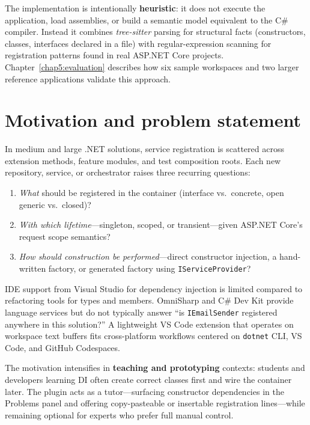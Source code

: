 The implementation is intentionally \textbf{heuristic}: it does not execute the application, load assemblies, or build a semantic model equivalent to the C\# compiler. Instead it combines \emph{tree-sitter} parsing for structural facts (constructors, classes, interfaces declared in a file) with regular-expression scanning for registration patterns found in real ASP.NET Core projects. Chapter~\ref{chap5:evaluation} describes how six sample workspaces and two larger reference applications validate this approach.

\section{Motivation and problem statement}
\label{chap1:motivation}

In medium and large .NET solutions, service registration is scattered across extension methods, feature modules, and test composition roots. Each new repository, service, or orchestrator raises three recurring questions:
\begin{enumerate}
	\item \emph{What} should be registered in the container (interface vs.\ concrete, open generic vs.\ closed)?
	\item \emph{With which lifetime}---singleton, scoped, or transient---given ASP.NET Core's request scope semantics?
	\item \emph{How should construction be performed}---direct constructor injection, a hand-written factory, or generated factory using \texttt{IServiceProvider}?
\end{enumerate}

IDE support from Visual Studio for dependency injection is limited compared to refactoring tools for types and members. OmniSharp and C\# Dev Kit provide language services but do not typically answer ``is \texttt{IEmailSender} registered anywhere in this solution?'' A lightweight VS Code extension that operates on workspace text buffers fits cross-platform workflows centered on \texttt{dotnet} CLI, VS Code, and GitHub Codespaces.

The motivation intensifies in \textbf{teaching and prototyping} contexts: students and developers learning DI often create correct classes first and wire the container later. The plugin acts as a tutor---surfacing constructor dependencies in the Problems panel and offering copy-pasteable or insertable registration lines---while remaining optional for experts who prefer full manual control.

